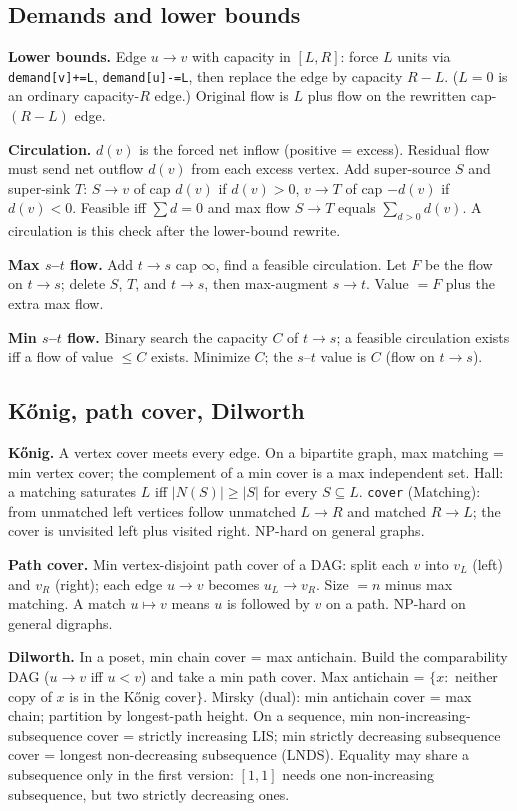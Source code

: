 	\subsection{Demands and lower bounds}
		\noindent\textbf{Lower bounds.}
		Edge $u\to v$ with capacity in $[L,R]$: force $L$
		units via \texttt{demand[v]+=L}, \texttt{demand[u]-=L},
		then replace the edge by capacity $R-L$.
		($L=0$ is an ordinary capacity-$R$ edge.)
		Original flow is $L$ plus flow on the rewritten
		cap-$(R-L)$ edge.

		\noindent\textbf{Circulation.}
		$d(v)$ is the forced net inflow (positive = excess).
		Residual flow must send net outflow $d(v)$ from each
		excess vertex. Add super-source $S$ and super-sink $T$:
		$S\to v$ of cap $d(v)$ if $d(v)>0$, $v\to T$ of cap
		$-d(v)$ if $d(v)<0$. Feasible iff $\sum d=0$ and max
		flow $S\to T$ equals $\sum_{d>0} d(v)$. A circulation
		is this check after the lower-bound rewrite.

		\noindent\textbf{Max $s$--$t$ flow.}
		Add $t\to s$ cap $\infty$, find a feasible
		circulation. Let $F$ be the flow on $t\to s$;
		delete $S$, $T$, and $t\to s$, then max-augment
		$s\to t$. Value $= F$ plus the extra max flow.

		\noindent\textbf{Min $s$--$t$ flow.}
		Binary search the capacity $C$ of $t\to s$; a
		feasible circulation exists iff a flow of value
		$\le C$ exists. Minimize $C$; the $s$--$t$ value
		is $C$ (flow on $t\to s$).
	\subsection{Kőnig, path cover, Dilworth}
		\noindent\textbf{Kőnig.}
		A vertex cover meets every edge. On a bipartite
		graph, max matching = min vertex cover; the
		complement of a min cover is a max independent
		set. Hall: a matching saturates $L$ iff
		$|N(S)|\ge|S|$ for every $S\subseteq L$.
		\texttt{cover} (Matching): from unmatched left
		vertices follow unmatched $L\to R$ and matched
		$R\to L$; the cover is unvisited left plus
		visited right. NP-hard on general graphs.

		\noindent\textbf{Path cover.}
		Min vertex-disjoint path cover of a DAG: split
		each $v$ into $v_L$ (left) and $v_R$ (right);
		each edge $u\to v$ becomes $u_L\to v_R$. Size
		$= n$ minus max matching. A match $u\mapsto v$
		means $u$ is followed by $v$ on a path.
		NP-hard on general digraphs.

		\noindent\textbf{Dilworth.}
		In a poset, min chain cover = max antichain.
		Build the comparability DAG ($u\to v$ iff $u<v$)
		and take a min path cover. Max antichain =
		$\{x:$ neither copy of $x$ is in the Kőnig
		cover$\}$.
		Mirsky (dual): min antichain cover = max chain;
		partition by longest-path height.
		On a sequence, min non-increasing-subsequence cover
		= strictly increasing LIS; min strictly decreasing
		subsequence cover = longest non-decreasing subsequence
		(LNDS). Equality may share a subsequence only in the
		first version: $[1,1]$ needs one non-increasing
		subsequence, but two strictly decreasing ones.

